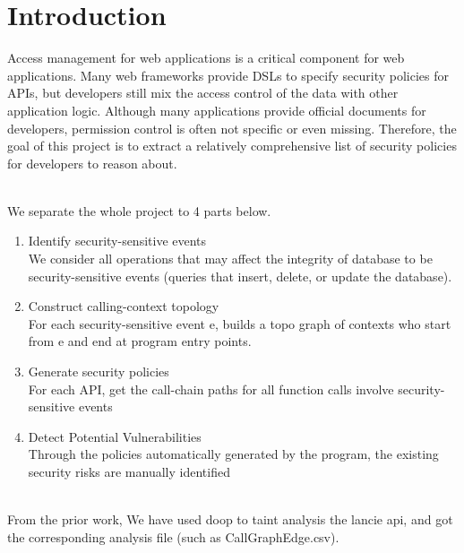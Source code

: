 \section{Introduction}%


    Access management for web applications is a critical component for web applications. 
    Many web frameworks provide DSLs to specify security policies for APIs, but developers still mix the access control of the data with other application logic. 
    Although many applications provide official documents for developers, permission control is often not specific or even missing. 
    Therefore, the goal of this project is to extract a relatively comprehensive list of security policies for developers to reason about.
    
    ~\\
    We separate the whole project to 4 parts below.
    \begin{enumerate}
        \item Identify security-sensitive events 
        ~\\ We consider all operations that may affect the integrity of database to be security-sensitive events (queries that insert, delete, or update the database).
    
        \item Construct calling-context topology
        ~\\ For each security-sensitive event e, builds a topo graph of contexts who start from e and end at program entry points.
        
        \item Generate security policies
        ~\\ For each API,  get the call-chain paths for all function calls involve security-sensitive events
        
        \item Detect Potential Vulnerabilities
        ~\\ Through the policies automatically generated by the program, the existing security risks are manually identified
    \end{enumerate}
    
  ~\\
  From the prior work, We have used doop to taint analysis the lancie api, and got the corresponding analysis file (such as CallGraphEdge.csv).
  
